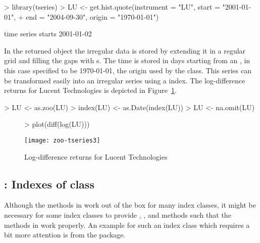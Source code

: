 \documentclass{Z}
\begin{document}
\begin{Schunk}
\begin{Sinput}
> library(tseries)
> LU <- get.hist.quote(instrument = "LU", start = "2001-01-01", 
+     end = "2004-09-30", origin = "1970-01-01")
\end{Sinput}
\end{Schunk}

\begin{Schunk}
\begin{Soutput}
time series starts 2001-01-02
\end{Soutput}
\end{Schunk}

In the returned  object the irregular data is stored by extending
it in a regular grid and filling the gaps with s. The time is stored
in days starting from an , in this case specified to be 1970-01-01, the
origin used by the  class.
This series can be transformed easily into an irregular  series 
using a  index. The log-difference returns for Lucent 
Technologies is depicted in Figure~\ref{fig:tseries}.

\begin{Schunk}
\begin{Sinput}
> LU <- as.zoo(LU)
> index(LU) <- as.Date(index(LU))
> LU <- na.omit(LU)
\end{Sinput}
\end{Schunk}

\begin{figure}
\begin{center}
\begin{Schunk}
\begin{Sinput}
> plot(diff(log(LU)))
\end{Sinput}
\end{Schunk}
\texttt{[image: zoo-tseries3]}
\caption{\label{fig:tseries} Log-difference returns for Lucent Technologies}
\end{center}
\end{figure}


\subsection[fBasics: Indexes of class "timeDate"]{: Indexes of class }
\label{sec:fBasics}

Although the methods in  work out of the box for many index classes,
it might be necessary for some index classes to provide , ,
 and  methods such that the methods in  
work properly. An example for such an index class which requires a bit more
attention is  from the  package.
\end{document}
